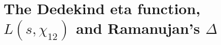 \chapter{The Dedekind eta function, \texorpdfstring{$L(s,\chi_{12})$}{L(s,chi12)} and Ramanujan's \texorpdfstring{$\Delta$}{Delta}}\label{vol1:ch15}


